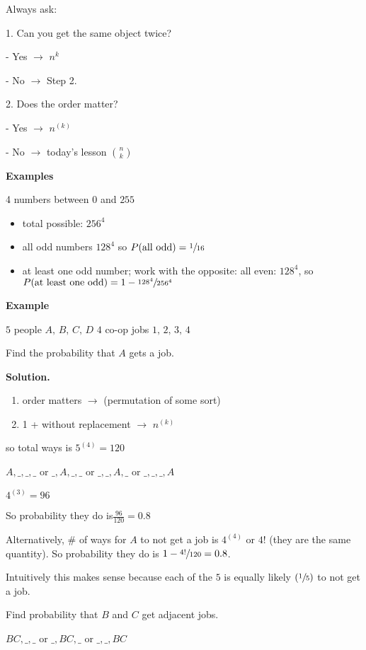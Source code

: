 Always ask:

1. Can you get the same object twice?

- Yes $ \rightarrow $ $ n^k $

- No $ \rightarrow $ Step 2.

2. Does the order matter?

- Yes $ \rightarrow $ $ n^{(k)} $

- No $ \rightarrow $ today's lesson $ \binom{n}{k} $

\textbf{Examples}

4 numbers between $ 0 $ and $ 255 $
\begin{itemize}
    \item total possible: $256^4$
    \item all odd numbers $ 128^4 $ so $ P(\text{all odd})=\sfrac{1}{16} $
    \item at least one odd number; work with the opposite: all even: $ 128^4 $,
          so $ P(\text{at least one odd})=1-\sfrac{128^4}{256^4} $
\end{itemize}

\textbf{Example}

$ 5 $ people $ A,\,B,\,C,\,D $ $ 4 $ co-op jobs $ 1,\,2,\,3,\,4 $

Find the probability that $ A $ gets a job.

\textbf{Solution.}
\begin{enumerate}
    \item order matters $ \rightarrow $ (permutation of some sort)
    \item 1 + without replacement $ \rightarrow $ $ n^{(k)} $
\end{enumerate}

so total ways is $ 5^{(4)}=120 $

$ A,\_,\_,\_ $ or $ \_,A,\_,\_ $ or $\_,\_,A,\_$ or $\_,\_,\_,A$

$ 4^{(3)}=96 $

So probability they do is$ \frac{96}{120} =0.8 $

Alternatively, \# of ways for $ A $ to not get a job is $ 4^{(4)} $ or $ 4! $
(they are the same quantity).
So probability they do is $ 1-\sfrac{4!}{120}=0.8 $.

Intuitively this makes sense because each of the $ 5 $ is equally likely
$ (\sfrac{1}{5}) $ to not get a job.

Find probability that $ B $ and $ C $ get adjacent jobs.

$ BC,\_,\_ $ or $ \_,BC,\_ $ or $ \_,\_,BC $

